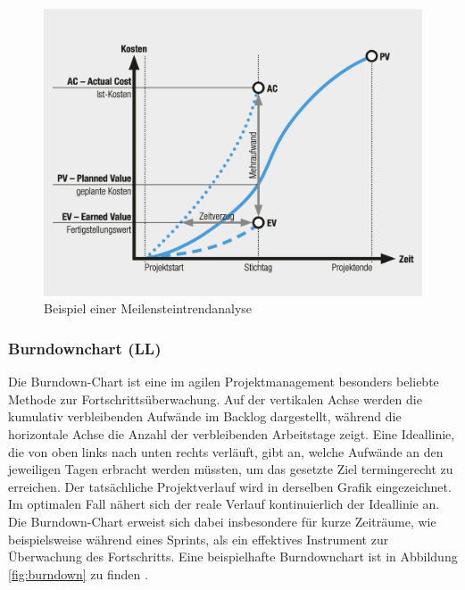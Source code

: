 \documentclass[ThesisDJ.tex]{subfiles}
\begin{document}
    \begin{figure}
        \includegraphics[scale=0.5]{mta.png}
        \centering
        \caption{Beispiel einer Meilensteintrendanalyse}
        \label{fig:mta}
    \end{figure}

    \subsubsection{Burndownchart (LL)}
    Die Burndown-Chart ist eine im agilen Projektmanagement besonders beliebte Methode zur Fortschrittsüberwachung. 
    Auf der vertikalen Achse werden die kumulativ verbleibenden Aufwände im Backlog dargestellt, während die horizontale Achse die Anzahl der verbleibenden Arbeitstage zeigt. 
    Eine Ideallinie, die von oben links nach unten rechts verläuft, gibt an, welche Aufwände an den jeweiligen Tagen erbracht werden müssten, um das gesetzte Ziel termingerecht zu erreichen. 
    Der tatsächliche Projektverlauf wird in derselben Grafik eingezeichnet. Im optimalen Fall nähert sich der reale Verlauf kontinuierlich der Ideallinie an. 
    Die Burndown-Chart erweist sich dabei insbesondere für kurze Zeiträume, wie beispielsweise während eines Sprints, als ein effektives Instrument zur Überwachung des Fortschritts.
    Eine beispielhafte Burndownchart ist in Abbildung \ref{fig:burndown} zu finden \cite[S.~279]{dechange_projektmanagement_2024}.
\end{document}
